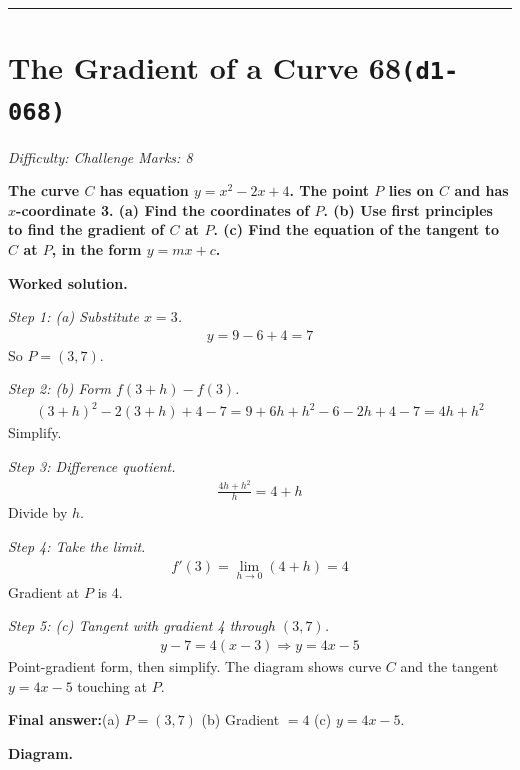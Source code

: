 \documentclass[11pt]{article}
\newcommand{\question}[1]{\par\medskip\noindent\textbf{#1}\par}
\begin{document}
\medskip\hrule

\section*{The Gradient of a Curve 68\quad\small\texttt{(d1-068)}}
\textit{Difficulty: Challenge \quad\textbar\quad Marks: 8}

\question{The curve \( C \) has equation \( y = x^2 - 2x + 4 \). The point \( P \) lies on \( C \) and has \( x \)-coordinate 3. (a) Find the coordinates of \( P \). (b) Use first principles to find the gradient of \( C \) at \( P \). (c) Find the equation of the tangent to \( C \) at \( P \), in the form \( y = mx + c \).}

\textbf{Worked solution.}

\textit{Step 1: (a) Substitute \( x = 3 \).}
\[\begin{gathered}
y = 9 - 6 + 4 = 7
\end{gathered}\]
So \( P = (3, 7) \).

\textit{Step 2: (b) Form \( f(3+h) - f(3) \).}
\[\begin{gathered}
(3+h)^2 - 2(3+h) + 4 - 7 = 9 + 6h + h^2 - 6 - 2h + 4 - 7 = 4h + h^2
\end{gathered}\]
Simplify.

\textit{Step 3: Difference quotient.}
\[\begin{gathered}
\frac{4h + h^2}{h} = 4 + h
\end{gathered}\]
Divide by \( h \).

\textit{Step 4: Take the limit.}
\[\begin{gathered}
f'(3) = \lim_{h \to 0}(4 + h) = 4
\end{gathered}\]
Gradient at \( P \) is 4.

\textit{Step 5: (c) Tangent with gradient 4 through \( (3, 7) \).}
\[\begin{gathered}
y - 7 = 4(x - 3) \Rightarrow y = 4x - 5
\end{gathered}\]
Point-gradient form, then simplify. The diagram shows curve \( C \) and the tangent \( y = 4x - 5 \) touching at \( P \).

\begin{answerbox}
\textbf{Final answer:}\quad (a) \(\displaystyle  P = (3, 7) \) \quad  (b) Gradient \(\displaystyle  = 4 \) \quad  (c) \(\displaystyle  y = 4x - 5 \).
\end{answerbox}
\textbf{Diagram.}
\end{document}
